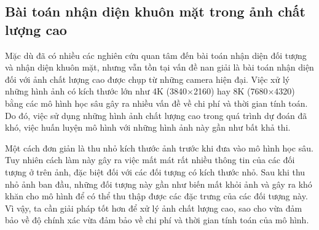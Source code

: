 {    \subsection{Bài toán nhận diện khuôn mặt trong ảnh chất lượng cao}
    Mặc dù đã có nhiều các nghiên cứu quan tâm đến bài toán nhận diện đối tượng  và nhận diện khuôn mặt, nhưng vẫn tồn tại vấn đề nan giải là bài toán nhận diện đối với ảnh chất lượng cao được chụp từ những camera hiện đại.
    Việc xử lý những hình ảnh có kích thước lớn như 4K (3840×2160) hay 8K (7680×4320) bằng các mô hình học sâu gây ra nhiều vấn đề về chi phí và thời gian tính toán.
    Do đó, việc sử dụng những hình ảnh chất lượng cao trong quá trình dự đoán đã khó, việc huấn luyện mô hình với những hình ảnh này gần như bất khả thi.

    \noindent
    Một cách đơn giản là thu nhỏ kích thước ảnh trước khi đưa vào mô hình học sâu.
    Tuy nhiên cách làm này gây ra việc mất mát rất nhiều thông tin của các đối tượng ở trên ảnh, đặc biệt đối với các đối tượng có kích thước nhỏ.
    Sau khi thu nhỏ ảnh ban đầu, những đối tượng này gần như biến mất khỏi ảnh và gây ra khó khăn cho mô hình để có thể thu thập được các đặc trưng của các đối tượng này.
    Vì vậy, ta cần giải pháp tốt hơn để xử lý ảnh chất lượng cao, sao cho vừa đảm bảo về độ chính xác vừa đảm bảo về chi phí và thời gian tính toán của mô hình.
}
